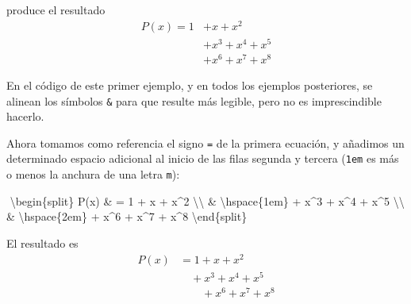 \documentclass[
  letterpaper,
  DIV=11,
  numbers=noendperiod]{scrartcl}
\newenvironment{Shaded}{\begin{snugshade}}{\end{snugshade}}
\newcommand{\ExtensionTok}[1]{\textcolor[rgb]{0.00,0.23,0.31}{#1}}
\newcommand{\KeywordTok}[1]{\textcolor[rgb]{0.00,0.23,0.31}{#1}}
\newcommand{\NormalTok}[1]{\textcolor[rgb]{0.00,0.23,0.31}{#1}}
\newcommand{\SpecialCharTok}[1]{\textcolor[rgb]{0.37,0.37,0.37}{#1}}
\newcommand{\SpecialStringTok}[1]{\textcolor[rgb]{0.13,0.47,0.30}{#1}}
\begin{document}
produce el resultado \[
\begin{split}
P(x) = 1 & + x + x^2 \\
         & + x^3 + x^4 + x^5 \\
         & + x^6 + x^7 + x^8
\end{split}
\]

\begin{tcolorbox}[enhanced jigsaw, arc=.35mm, opacityback=0, bottomrule=.15mm, leftrule=.75mm, breakable, rightrule=.15mm, left=2mm, colback=white, toprule=.15mm, colframe=quarto-callout-note-color-frame]
\begin{minipage}[t]{5.5mm}
\textcolor{quarto-callout-note-color}{\faInfo}
\end{minipage}%
\begin{minipage}[t]{\textwidth - 5.5mm}

En el código de este primer ejemplo, y en todos los ejemplos
posteriores, se alinean los símbolos \texttt{\&} para que resulte más
legible, pero no es imprescindible hacerlo.

\end{minipage}%
\end{tcolorbox}

Ahora tomamos como referencia el signo \texttt{=} de la primera
ecuación, y añadimos un determinado espacio adicional al inicio de las
filas segunda y tercera (\texttt{1em} es más o menos la anchura de una
letra \texttt{m}):

\begin{Shaded}
\begin{Highlighting}[]
\SpecialStringTok{$$}
\KeywordTok{\textbackslash{}begin}\NormalTok{\{}\ExtensionTok{split}\NormalTok{\}}
\SpecialStringTok{P(x) \& = 1  + x + x\^{}2 }\SpecialCharTok{\textbackslash{}\textbackslash{}}
\SpecialStringTok{     \& }\SpecialCharTok{\textbackslash{}hspace}\SpecialStringTok{\{1em\} + x\^{}3 + x\^{}4 + x\^{}5 }\SpecialCharTok{\textbackslash{}\textbackslash{}}
\SpecialStringTok{     \& }\SpecialCharTok{\textbackslash{}hspace}\SpecialStringTok{\{2em\} + x\^{}6 + x\^{}7 + x\^{}8}
\KeywordTok{\textbackslash{}end}\NormalTok{\{}\ExtensionTok{split}\NormalTok{\}}
\SpecialStringTok{$$}
\end{Highlighting}
\end{Shaded}

El resultado es \[
\begin{split}
P(x) & = 1  + x + x^2 \\
     & \hspace{1em} + x^3 + x^4 + x^5 \\
     & \hspace{2em} + x^6 + x^7 + x^8
\end{split}
\]
\end{document}
